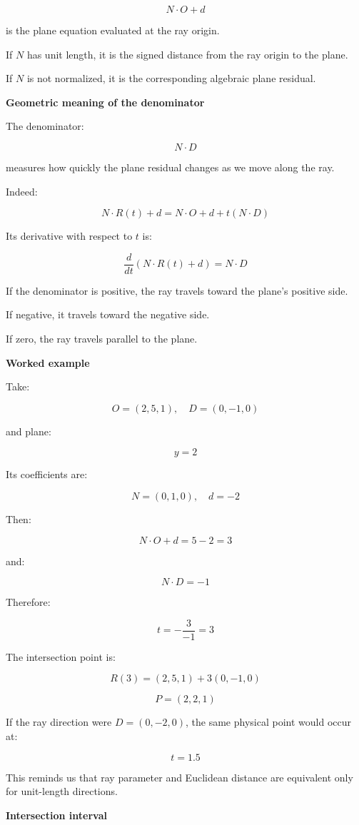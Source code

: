 \[
N\cdot O+d
\]

is the plane equation evaluated at the ray origin.

If \(N\) has unit length, it is the signed distance from the ray origin to the plane.

If \(N\) is not normalized, it is the corresponding algebraic plane residual.

\textbf{Geometric meaning of the denominator}

The denominator:

\[
N\cdot D
\]

measures how quickly the plane residual changes as we move along the ray.

Indeed:

\[
N\cdot R(t)+d= N\cdot O+d+t(N\cdot D)
\]

Its derivative with respect to \(t\) is:

\[
\frac{d}{dt}(N\cdot R(t)+d)=N\cdot D
\]

If the denominator is positive, the ray travels toward the plane's positive side.

If negative, it travels toward the negative side.

If zero, the ray travels parallel to the plane.

\textbf{Worked example}

Take:

\[
O=(2,5,1),\quad D=(0,-1,0)
\]

and plane:

\[
y=2
\]

Its coefficients are:

\[
N=(0,1,0),\quad d=-2
\]

Then:

\[
N\cdot O+d=5-2=3
\]

and:

\[
N\cdot D=-1
\]

Therefore:

\[
t=-\frac3{-1}=3
\]

The intersection point is:

\[
R(3)=(2,5,1)+3(0,-1,0)
\]

\[
\boxed{P=(2,2,1)}
\]

If the ray direction were \(D=(0,-2,0)\), the same physical point would occur at:

\[
t=1.5
\]

This reminds us that ray parameter and Euclidean distance are equivalent only for unit-length directions.

\textbf{Intersection interval}

